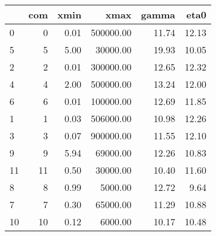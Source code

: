 \begin{tabular}{lrrrrr}
\toprule
{} &  com &  xmin &      xmax &  gamma &  eta0 \\
\midrule
0  &    0 &  0.01 & 500000.00 &  11.74 & 12.13 \\
5  &    5 &  5.00 &  30000.00 &  19.93 & 10.05 \\
2  &    2 &  0.01 & 300000.00 &  12.65 & 12.32 \\
4  &    4 &  2.00 & 500000.00 &  13.24 & 12.00 \\
6  &    6 &  0.01 & 100000.00 &  12.69 & 11.85 \\
1  &    1 &  0.03 & 506000.00 &  10.98 & 12.26 \\
3  &    3 &  0.07 & 900000.00 &  11.55 & 12.10 \\
9  &    9 &  5.94 &  69000.00 &  12.26 & 10.83 \\
11 &   11 &  0.50 &  30000.00 &  10.40 & 11.60 \\
8  &    8 &  0.99 &   5000.00 &  12.72 &  9.64 \\
7  &    7 &  0.30 &  65000.00 &  11.29 & 10.88 \\
10 &   10 &  0.12 &   6000.00 &  10.17 & 10.48 \\
\bottomrule
\end{tabular}
